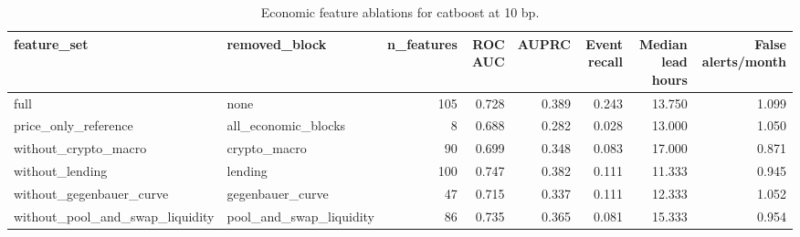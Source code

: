 \begin{table}
\caption{Economic feature ablations for catboost at 10 bp.}
\label{tab:ablation_10_catboost}
\begin{tabular}{llrrrrrr}
\toprule
feature\_set & removed\_block & n\_features & ROC AUC & AUPRC & Event recall & Median lead hours & False alerts/month \\
\midrule
full & none & 105 & 0.728 & 0.389 & 0.243 & 13.750 & 1.099 \\
price\_only\_reference & all\_economic\_blocks & 8 & 0.688 & 0.282 & 0.028 & 13.000 & 1.050 \\
without\_crypto\_macro & crypto\_macro & 90 & 0.699 & 0.348 & 0.083 & 17.000 & 0.871 \\
without\_lending & lending & 100 & 0.747 & 0.382 & 0.111 & 11.333 & 0.945 \\
without\_gegenbauer\_curve & gegenbauer\_curve & 47 & 0.715 & 0.337 & 0.111 & 12.333 & 1.052 \\
without\_pool\_and\_swap\_liquidity & pool\_and\_swap\_liquidity & 86 & 0.735 & 0.365 & 0.081 & 15.333 & 0.954 \\
\bottomrule
\end{tabular}
\end{table}
